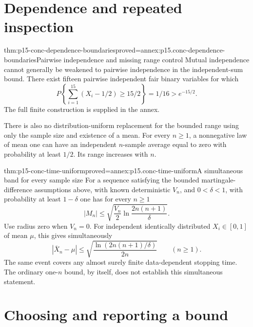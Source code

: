 \section{Dependence and repeated inspection}

\begin{hbtheorem}{thm:p15-conc-dependence-boundaries}{proved=annex:p15.conc-dependence-boundaries}{Pairwise independence and missing range control}
Mutual independence cannot generally be weakened to pairwise independence
in the independent-sum bound. There exist fifteen pairwise independent
fair binary variables for which
\[
        P\!\left\{\sum_{i=1}^{15}(X_i-1/2)\geq15/2\right\}
                         =1/16>e^{-15/2}.
\]
The full finite construction is supplied in the annex.

There is also no distribution-uniform replacement for the bounded
range using only the sample size and existence of a mean.
For every \(n\geq1\), a nonnegative law of mean one can have
an independent \(n\)-sample average equal to zero with probability
at least \(1/2\). Its range increases with \(n\).
\end{hbtheorem}

\begin{hbtheorem}{thm:p15-conc-time-uniform}{proved=annex:p15.conc-time-uniform}{A simultaneous band for every sample size}
For a sequence satisfying the bounded martingale-difference assumptions
above, with known deterministic \(V_n\), and \(0<\delta<1\),
with probability at least \(1-\delta\) one has for every \(n\geq1\)
\[
                 |M_n|\leq
                 \sqrt{\frac{V_n}{2}\ln\frac{2n(n+1)}{\delta}}.
\]
Use radius zero when \(V_n=0\).
For independent identically distributed \(X_i\in[0,1]\) of
mean \(\mu\), this gives simultaneously
\[
        |\bar X_n-\mu|
             \leq\sqrt{\frac{\ln(2n(n+1)/\delta)}{2n}}
                                  \qquad(n\geq1).
\]
The same event covers any almost surely finite data-dependent stopping
time. The ordinary one-\(n\) bound, by itself, does not establish
this simultaneous statement.
\end{hbtheorem}

\section{Choosing and reporting a bound}

